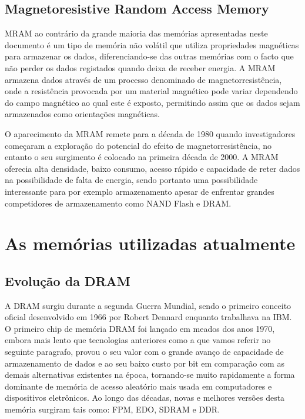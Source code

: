 \documentclass{report}
\begin{document}
\subsection{Magnetoresistive Random Access Memory}
\par \ac{MRAM} ao contrário da grande maioria das memórias apresentadas neste documento é um tipo de memória não volátil que utiliza propriedades magnéticas para armazenar os dados, diferenciando-se das outras memórias com o facto que não perder os dados registados quando deixa de receber energia. A \ac{MRAM} armazena dados através de um processo denominado de magnetorresistência, onde a resistência provocada por um material magnético pode variar dependendo do campo magnético ao qual este é exposto, permitindo assim que os dados sejam armazenados como orientações magnéticas.
\par O aparecimento da \ac{MRAM} remete para a década de 1980 quando investigadores começaram a exploração do potencial do efeito de magnetorresistência, no entanto o seu surgimento é colocado na primeira década de 2000. A \ac{MRAM} oferecia alta densidade, baixo consumo, acesso rápido e capacidade de reter dados na possibilidade de falta de energia, sendo portanto uma possibilidade interessante para por exemplo armazenamento apesar de enfrentar grandes competidores de armazenamento como NAND Flash e \ac{DRAM}.

\section{As memórias utilizadas atualmente}
\subsection{Evolução da \ac{DRAM}}


\par A \ac{DRAM} surgiu durante a segunda Guerra Mundial, sendo o primeiro conceito oficial desenvolvido em 1966 por Robert Dennard enquanto trabalhava na IBM. O primeiro chip de memória \ac{DRAM} foi lançado em meados dos anos 1970, embora mais lento que tecnologias anteriores como a que vamos referir no seguinte paragrafo, provou o seu valor com o grande avanço de capacidade de armazenamento de dados e ao seu baixo custo por bit em comparação com as demais alternativas existentes na época, tornando-se muito rapidamente a forma dominante de memória de acesso aleatório mais usada em computadores e dispositivos eletrônicos. Ao longo das décadas, novas e melhores versões desta memória surgiram tais como: \ac{FPM}, \ac{EDO}, \ac{SDRAM} e \ac{DDR}.
\end{document}
